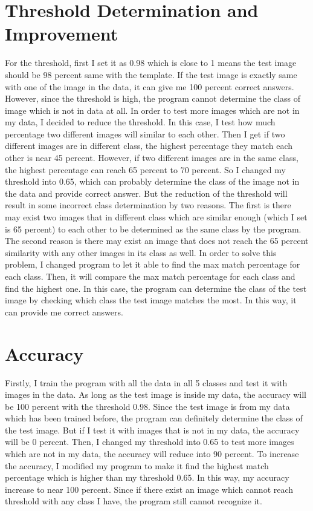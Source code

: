 \documentclass[12pt, oneside]{report}
\begin{document}
	\section{Threshold Determination and Improvement}
		For the threshold, first I set it as 0.98 which is close to 1 means the test image should be 98 percent same with the template. If the test image is exactly same with one of the image in the data, it can give me 100 percent correct answers. However, since the threshold is high, the program cannot determine the class of image which is not in data at all. In order to test more images which are not in my data, I decided to reduce the threshold. In this case, I test how much percentage two different images will similar to each other. Then I get if two different images are in different class, the highest percentage they match each other is near 45 percent. However, if two different images are in the same class, the highest percentage can reach 65 percent to 70 percent. So I changed my threshold into 0.65, which can probably determine the class of the image not in the data and provide correct answer. But the reduction of the threshold will result in some incorrect class determination by two reasons. The first is there may exist two images that in different class which are similar enough (which I set is 65 percent) to each other to be determined as the same class by the program. The second reason is there may exist an image that does not reach the 65 percent similarity with any other images in its class as well. In order to solve this problem, I changed program to let it able to find the max match percentage for each class. Then, it will compare the max match percentage for each class and find the highest one. In this case, the program can determine the class of the test image by checking which class the test image matches the most. In this way, it can provide me correct answers.
	\section{Accuracy}
		Firstly, I train the program with all the data in all 5 classes and test it with images in the data. As long as the test image is inside my data, the accuracy will be 100 percent with the threshold 0.98. Since the test image is from my data which has been trained before, the program can definitely determine the class of the test image. But if I test it with images that is not in my data, the accuracy will be 0 percent. Then, I changed my threshold into 0.65 to test more images which are not in my data, the accuracy will reduce into 90 percent. To increase the accuracy, I modified my program to make it find the highest match percentage which is higher than my threshold 0.65. In this way, my accuracy increase to near 100 percent. Since if there exist an image which cannot reach threshold with any class I have, the program still cannot recognize it.
\end{document}
